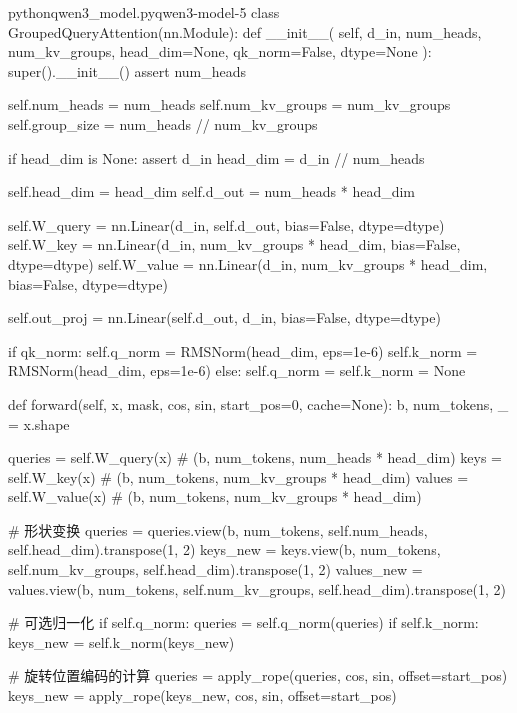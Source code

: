 \documentclass[lang=cn,newtx,10pt,scheme=chinese]{elegantbook}
\begin{document}
\begin{codebox}{python}{qwen3\_model.py}{qwen3-model-5}
class GroupedQueryAttention(nn.Module):
    def __init__(
        self, d_in, num_heads, num_kv_groups, head_dim=None, qk_norm=False, dtype=None
    ):
        super().__init__()
        assert num_heads %

        self.num_heads = num_heads
        self.num_kv_groups = num_kv_groups
        self.group_size = num_heads // num_kv_groups

        if head_dim is None:
            assert d_in %
            head_dim = d_in // num_heads

        self.head_dim = head_dim
        self.d_out = num_heads * head_dim

        self.W_query = nn.Linear(d_in, self.d_out, bias=False, dtype=dtype)
        self.W_key = nn.Linear(d_in, num_kv_groups * head_dim, bias=False, dtype=dtype)
        self.W_value = nn.Linear(d_in, num_kv_groups * head_dim, bias=False, dtype=dtype)

        self.out_proj = nn.Linear(self.d_out, d_in, bias=False, dtype=dtype)

        if qk_norm:
            self.q_norm = RMSNorm(head_dim, eps=1e-6)
            self.k_norm = RMSNorm(head_dim, eps=1e-6)
        else:
            self.q_norm = self.k_norm = None

    def forward(self, x, mask, cos, sin, start_pos=0, cache=None):
        b, num_tokens, _ = x.shape

        queries = self.W_query(x)  # (b, num_tokens, num_heads * head_dim)
        keys = self.W_key(x)       # (b, num_tokens, num_kv_groups * head_dim)
        values = self.W_value(x)   # (b, num_tokens, num_kv_groups * head_dim)

        # 形状变换
        queries = queries.view(b, num_tokens, self.num_heads, self.head_dim).transpose(1, 2)
        keys_new = keys.view(b, num_tokens, self.num_kv_groups, self.head_dim).transpose(1, 2)
        values_new = values.view(b, num_tokens, self.num_kv_groups, self.head_dim).transpose(1, 2)

        # 可选归一化
        if self.q_norm:
            queries = self.q_norm(queries)
        if self.k_norm:
            keys_new = self.k_norm(keys_new)

        # 旋转位置编码的计算
        queries = apply_rope(queries, cos, sin, offset=start_pos)
        keys_new = apply_rope(keys_new, cos, sin, offset=start_pos)


\end{codebox}
\end{document}
